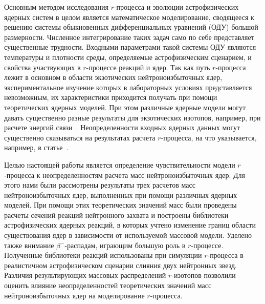 Основным методом исследования $r$-процесса и эволюции астрофизических ядерных систем в целом является математическое моделирование, сводящееся к решению системы обыкновенных дифференциальных уравнений (ОДУ) большой размерности. Численное интегрирование таких задач само по себе представляет существенные трудности. Входными параметрами такой системы ОДУ являются температуры и плотности среды, определяемые астрофизическим сценарием, и свойства участвующих в $r$-процессе реакций и ядер. Так как путь $r$-процесса лежит в основном в области экзотических нейтроноизбыточных ядер, экспериментальное изучение которых в лабораторных условиях представляется невозможным, их характеристики приходится получать при помощи теоретических ядерных моделей. При этом различные ядерные модели могут давать существенно разные результаты для экзотических изотопов, например, при расчете энергий связи~\cite{sobiczewski2018}. Неопределенности входных ядерных данных могут существенно сказываться на результатах расчета $r$-процесса, на что указывается, например, в статье~\cite{goriely2001}.

Целью настоящей работы является определение чувствительности модели $r$-процесса к неопределенностям расчета масс нейтроноизбыточных ядер. Для этого нами были рассмотрены результаты трех расчетов масс нейтроноизбыточных ядер, выполненных при помощи различных ядерных моделей. При помощи этих теоретических значений масс были проведены расчеты сечений реакций нейтронного захвата и построены библиотеки астрофизических ядерных реакций, в которых учтено изменение границ области существования ядер в зависимости от используемой массовой модели. Уделено также внимание $\beta^-$-распадам, играющим большую роль в $r$-процессе. Полученные библиотеки реакций использованы при симуляции $r$-процесса в реалистичном астрофизическом сценарии слияния двух нейтронных звезд. Различия результирующих массовых распределений $r$-изотопов позволили оценить влияние неопределенностей теоретических значений масс нейтроноизбыточных ядер на моделирование $r$-процесса.
